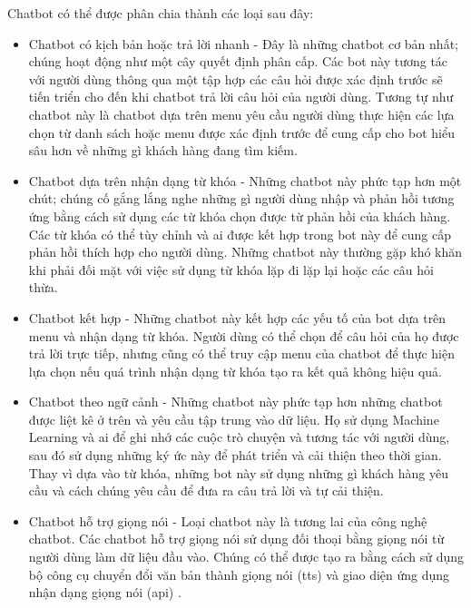 Chatbot có thể được phân chia thành các loại sau đây:
\begin{itemize}
    \item Chatbot có kịch bản hoặc trả lời nhanh - Đây là những chatbot cơ bản nhất; chúng hoạt động như một cây quyết định phân cấp. Các bot này tương tác với người dùng thông qua một tập hợp các câu hỏi được xác định trước sẽ tiến triển cho đến khi chatbot trả lời câu hỏi của người dùng. Tương tự như chatbot này là chatbot dựa trên menu yêu cầu người dùng thực hiện các lựa chọn từ danh sách hoặc menu được xác định trước để cung cấp cho bot hiểu sâu hơn về những gì khách hàng đang tìm kiếm.

    \item Chatbot dựa trên nhận dạng từ khóa - Những chatbot này phức tạp hơn một chút; chúng cố gắng lắng nghe những gì người dùng nhập và phản hồi tương ứng bằng cách sử dụng các từ khóa chọn được từ phản hồi của khách hàng. Các từ khóa có thể tùy chỉnh và \ac{ai} được kết hợp trong bot này để cung cấp phản hồi thích hợp cho người dùng. Những chatbot này thường gặp khó khăn khi phải đối mặt với việc sử dụng từ khóa lặp đi lặp lại hoặc các câu hỏi thừa.

    \item Chatbot kết hợp - Những chatbot này kết hợp các yếu tố của bot dựa trên menu và nhận dạng từ khóa. Người dùng có thể chọn để câu hỏi của họ được trả lời trực tiếp, nhưng cũng có thể truy cập menu của chatbot để thực hiện lựa chọn nếu quá trình nhận dạng từ khóa tạo ra kết quả không hiệu quả.

    \item Chatbot theo ngữ cảnh - Những chatbot này phức tạp hơn những chatbot được liệt kê ở trên và yêu cầu tập trung vào dữ liệu. Họ sử dụng Machine Learning và \ac{ai} để ghi nhớ các cuộc trò chuyện và tương tác với người dùng, sau đó sử dụng những ký ức này để phát triển và cải thiện theo thời gian. Thay vì dựa vào từ khóa, những bot này sử dụng những gì khách hàng yêu cầu và cách chúng yêu cầu để đưa ra câu trả lời và tự cải thiện.

    \item Chatbot hỗ trợ giọng nói - Loại chatbot này là tương lai của công nghệ chatbot. Các chatbot hỗ trợ giọng nói sử dụng đối thoại bằng giọng nói từ người dùng làm dữ liệu đầu vào. Chúng có thể được tạo ra bằng cách sử dụng bộ công cụ chuyển đổi văn bản thành giọng nói (\ac{tts}) và giao diện ứng dụng nhận dạng giọng nói (\ac{api}) \cite{chat-bot}.

\end{itemize}
